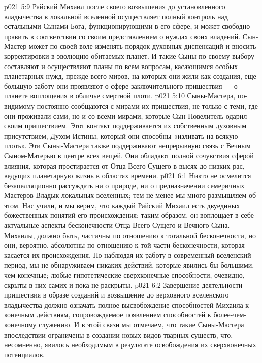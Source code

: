 \vs p021 5:9 Райский Михаил после своего возвышения до установленного владычества в локальной вселенной осуществляет полный контроль над остальными Сынами Бога, функционирующими в его сфере, и может свободно править в соответствии со своим представлением о нуждах своих владений. Сын\hyp{}Мастер может по своей воле изменять порядок духовных диспенсаций и вносить корректировки в эволюцию обитаемых планет. И такие Сыны по своему выбору составляют и осуществляют планы по всем вопросам, касающимся особых планетарных нужд, прежде всего миров, на которых они жили как создания, еще большую заботу они проявляют о сфере заключительного пришествия --- о планете воплощения в обличье смертной плоти.
\vs p021 5:10 Сыны\hyp{}Мастера, по\hyp{}видимому постоянно сообщаются с мирами их пришествия, не только с теми, где они проживали сами, но и со всеми мирами, которые Сын\hyp{}Повелитель одарил своим пришествием. Этот контакт поддерживается их собственным духовным присутствием, Духом Истины, который они способны «изливать на всякую плоть». Эти Сыны\hyp{}Мастера также поддерживают непрерывную связь с Вечным Сыном\hyp{}Матерью в центре всех вещей. Они обладают полной сочувствия сферой влияния, которая простирается от Отца Всего Сущего в высях до низких рас, ведущих планетарную жизнь в областях времени.
\vs p021 6:1 Никто не осмелится безапелляционно рассуждать ни о природе, ни о предназначении семеричных Мастеров\hyp{}Владык локальных вселенных; тем не менее мы много размышляем об этом. Нас учили, и мы верим, что каждый Райский Михаил есть  двуединых божественных понятий его происхождения; таким образом, он воплощает в себе актуальные аспекты бесконечности Отца Всего Сущего и Вечного Сына. Михаилы, должно быть, частичны по отношению к тотальной бесконечности, но они, вероятно, абсолютны по отношению к той части бесконечности, которая касается их происхождения. Но наблюдая их работу в современный вселенский период, мы не обнаруживаем никаких действий, которые явились бы большими, чем конечные; любые гипотетические сверхконечные способности, очевидно, скрыты в них самих и пока не раскрыты.
\vs p021 6:2 Завершение деятельности пришествия в образе созданий и возвышение до верховного вселенского владычества должно означать полное высвобождение способностей Михаила к конечным действиям, сопровождаемое появлением способностей к более\hyp{}чем\hyp{}конечному служению. И в этой связи мы отмечаем, что такие Сыны\hyp{}Мастера впоследствии ограничены в создании новых видов тварных существ, что, несомненно, явилось необходимым в результате освобождения их сверхконечных потенциалов.
